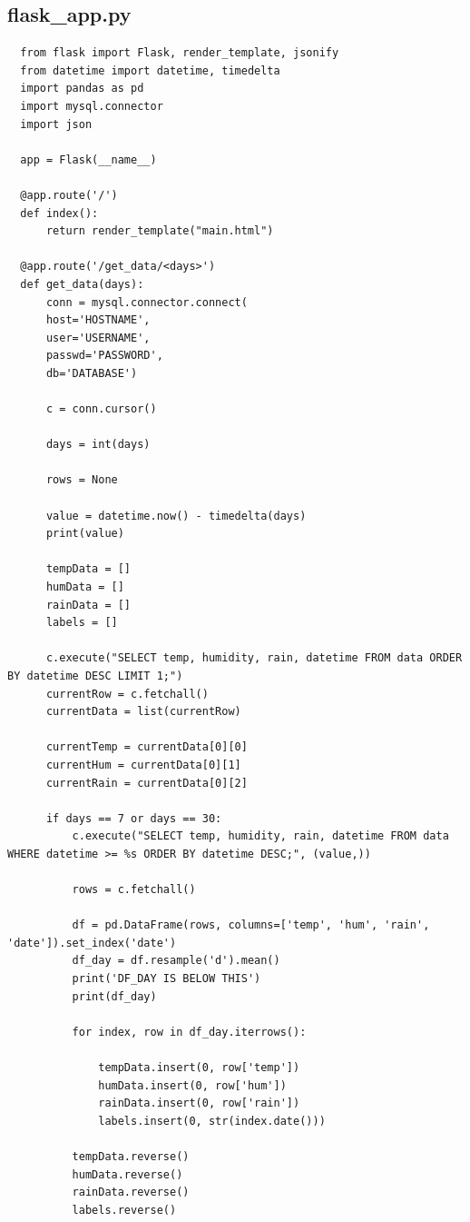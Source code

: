 \documentclass[10pt,a4paper]{article}
\begin{document}
\subsection{flask\_app.py}
\begin{verbatim}
  from flask import Flask, render_template, jsonify
  from datetime import datetime, timedelta
  import pandas as pd
  import mysql.connector
  import json

  app = Flask(__name__)

  @app.route('/')
  def index():
      return render_template("main.html")

  @app.route('/get_data/<days>')
  def get_data(days):
      conn = mysql.connector.connect(
      host='HOSTNAME',
      user='USERNAME',
      passwd='PASSWORD',
      db='DATABASE')

      c = conn.cursor()

      days = int(days)

      rows = None

      value = datetime.now() - timedelta(days)
      print(value)

      tempData = []
      humData = []
      rainData = []
      labels = []

      c.execute("SELECT temp, humidity, rain, datetime FROM data ORDER BY datetime DESC LIMIT 1;")
      currentRow = c.fetchall()
      currentData = list(currentRow)

      currentTemp = currentData[0][0]
      currentHum = currentData[0][1]
      currentRain = currentData[0][2]

      if days == 7 or days == 30:
          c.execute("SELECT temp, humidity, rain, datetime FROM data WHERE datetime >= %s ORDER BY datetime DESC;", (value,))

          rows = c.fetchall()

          df = pd.DataFrame(rows, columns=['temp', 'hum', 'rain', 'date']).set_index('date')
          df_day = df.resample('d').mean()
          print('DF_DAY IS BELOW THIS')
          print(df_day)

          for index, row in df_day.iterrows():

              tempData.insert(0, row['temp'])
              humData.insert(0, row['hum'])
              rainData.insert(0, row['rain'])
              labels.insert(0, str(index.date()))

          tempData.reverse()
          humData.reverse()
          rainData.reverse()
          labels.reverse()


\end{verbatim}
\end{document}
